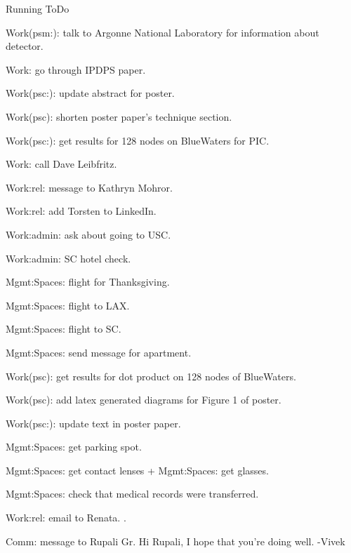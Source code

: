 \begin{columns}
\begin{column}{0.6\linewidth}
\begin{block}{Running ToDo}
  \item \tiny Work(psm:): talk to Argonne National Laboratory for information about detector. 
  \item \tiny Work: go through IPDPS paper. 

  \item \tiny Work(psc:): update abstract for poster. 
  \item \tiny Work(psc): shorten poster paper's technique section.
  \item \tiny Work(psc:): get results for 128 nodes on BlueWaters for PIC.     
  \item \tiny Work: call Dave Leibfritz.
 
  \item \tiny Work:rel: message to Kathryn Mohror. 
  \item \tiny Work:rel: add Torsten to LinkedIn.
    
  \item \tiny Work:admin: ask about going to USC. 
  \item \tiny Work:admin: SC hotel check. 

  \item \tiny Mgmt:Spaces: flight for Thanksgiving. 

  \item \tiny Mgmt:Spaces: flight to LAX. 
  \item \tiny Mgmt:Spaces: flight to SC. 
  \item \tiny Mgmt:Spaces: send message for apartment. 
  \item \tiny Work(psc): get results for dot product on 128 nodes of BlueWaters. 
  \item \tiny Work(psc): add latex generated diagrams for Figure 1 of poster. 
  \item \tiny Work(psc:): update text in poster paper. 
  \item \tiny Mgmt:Spaces: get parking spot. 
  \item \tiny Mgmt:Spaces: get contact lenses + Mgmt:Spaces: get glasses.    
  \item \tiny Mgmt:Spaces: check that medical records were transferred. 
        
  \item \tiny Work:rel: email to Renata. .      
    
  \item \tiny Comm: message to Rupali Gr. 
    Hi Rupali, I hope that you're doing well. -Vivek
    

\end{block}
\end{column}
\end{columns}
